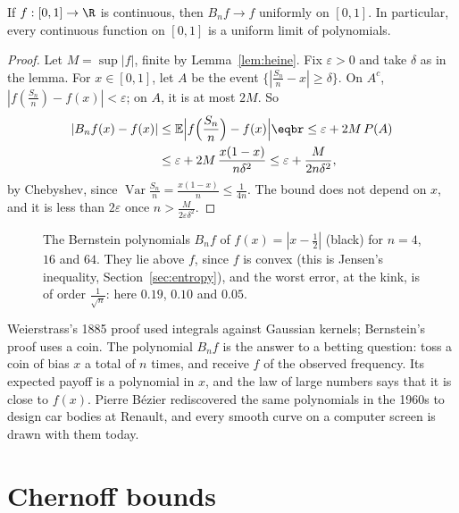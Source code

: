 \begin{theorem}\label{thm:weierstrass}
If $f:[0,1]\to\R$ is continuous, then $B_nf\to f$ uniformly on $[0,1]$. In particular, every continuous function on
$[0,1]$ is a uniform limit of polynomials.
\end{theorem}
\begin{proof}
Let $M=\sup|f|$, finite by Lemma~\ref{lem:heine}. Fix $\varepsilon>0$ and take $\delta$ as in the lemma. For $x\in[0,1]$, let $A$ be the event
$\bigl\{|\frac{S_n}n-x|\ge\delta\bigr\}$. On $A^c$, $|f(\frac{S_n}n)-f(x)|<\varepsilon$; on $A$, it is at most $2M$. So
\[
\begin{aligned}
|B_nf(x)-f(x)|&\le\mathbb E\Bigl|f\Bigl(\frac{S_n}n\Bigr)-f(x)\Bigr|\eqbr\le\varepsilon+2M\,P(A)\\
&\le\varepsilon+2M\,\frac{x(1-x)}{n\delta^2}\le\varepsilon+\frac M{2n\delta^2},
\end{aligned}
\]
by Chebyshev, since $\operatorname{Var}\frac{S_n}n=\frac{x(1-x)}n\le\frac1{4n}$. The bound does not depend on $x$, and it is less than $2\varepsilon$ once
$n>\frac M{2\varepsilon\delta^2}$.
\end{proof}

\begin{figure}[ht]
\centering
{}
\caption{The Bernstein polynomials $B_nf$ of $f(x)=|x-\frac12|$ (black) for $n=4$, $16$ and $64$. They lie above $f$, since $f$ is
convex (this is Jensen's inequality, Section~\ref{sec:entropy}), and the worst error, at the kink, is of order $\frac1{\sqrt n}$: here
$0.19$, $0.10$ and $0.05$.}
\label{fig:bernstein}
\end{figure}

\begin{beauty}
Weierstrass's 1885 proof used integrals against Gaussian kernels; Bernstein's proof uses a coin. The polynomial
$B_nf$ is the answer to a betting question: toss a coin of bias $x$ a total of $n$ times, and receive $f$ of the
observed frequency. Its expected payoff is a polynomial in $x$, and the law of large numbers says that it is close
to $f(x)$. Pierre B\'ezier rediscovered the same polynomials in the 1960s to design car bodies at Renault, and every
smooth curve on a computer screen is drawn with them today.
\end{beauty}

\section{Chernoff bounds}\label{sec:chernoff}

